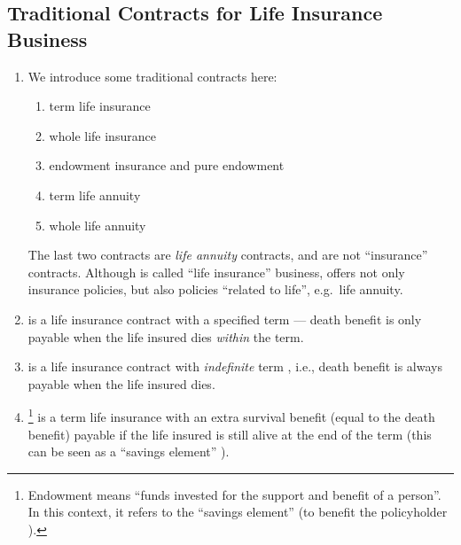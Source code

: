 \subsection{Traditional Contracts for Life Insurance Business}
\label{subsect:traditional-contracts}
\begin{enumerate}
\item We introduce some traditional contracts here:
\begin{enumerate}
\item term life insurance \textbar{}
\item whole life insurance \textbar{}
\item endowment insurance \textbar{}\textbar{} and pure endowment 
\item term life annuity \textbar{}
\item whole life annuity \textbar{}
\end{enumerate}
\begin{note}
The last two contracts are \emph{life annuity} contracts, and are
not ``insurance'' contracts. Although  is called ``life
insurance'' business,  offers not only insurance policies, but
also policies ``related to life'', e.g.\ life annuity.
\end{note}

\item {} is a life insurance contract
 with a specified term --- death benefit is
only payable when the life insured dies \emph{within} the term.

\item {} is a life insurance contract
 with \emph{indefinite} term , i.e., death
benefit is always payable when the life insured dies.

\item {}\footnote{Endowment means ``funds invested for
the support and benefit of a person''. In this context, it refers to the
``savings element''  (to benefit the policyholder
).} is a term life insurance
\textbar{} with an extra survival benefit
 (equal to the death benefit) payable if the life
insured is still alive at the end of the term (this can be seen as a ``savings
element'' ).


\end{enumerate}
